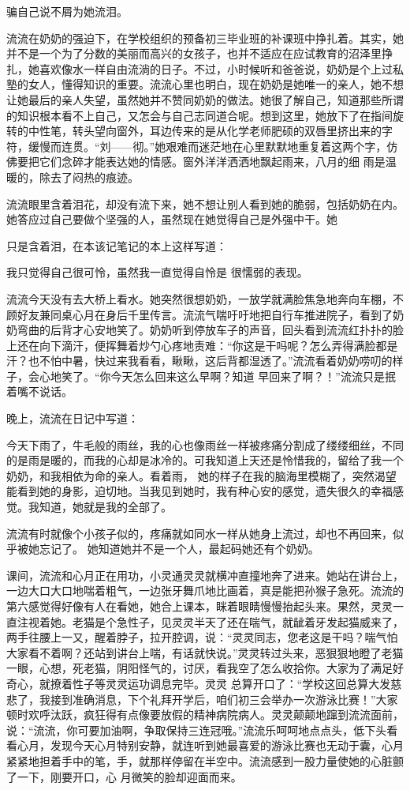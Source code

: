 \documentclass{article}
\begin{document}
\newpage
骗自己说不屑为她流泪。 

流流在奶奶的强迫下，在学校组织的预备初三毕业班的补课班中挣扎着。其实，她并不是一个为了分数的美丽而高兴的女孩子，也并不适应在应试教育的沼泽里挣扎，她喜欢像水一样自由流淌的日子。不过，小时候听和爸爸说，奶奶是个上过私塾的女人，懂得知识的重要。流流心里也明白，现在奶奶是她唯一的亲人，她不想让她最后的亲人失望，虽然她并不赞同奶奶的做法。她很了解自己，知道那些所谓的知识根本看不上自己，又怎会与自己志同道合呢。想到这里，她放下了在指间旋转的中性笔，转头望向窗外，耳边传来的是从化学老师肥硕的双唇里挤出来的字符，缓慢而连贯。“刘——彻。”她艰难而迷茫地在心里默默地重复着这两个字，仿佛要把它们念碎才能表达她的情感。窗外洋洋洒洒地飘起雨来，八月的细
雨是温暖的，除去了闷热的痕迹。 

流流眼里含着泪花，却没有流下来，她不想让别人看到她的脆弱，包括奶奶在内。她答应过自己要做个坚强的人，虽然现在她觉得自己是外强中干。她

\newpage
只是含着泪，在本该记笔记的本上这样写道： 

我只觉得自己很可怜，虽然我一直觉得自怜是
很懦弱的表现。 

流流今天没有去大桥上看水。她突然很想奶奶，一放学就满脸焦急地奔向车棚，不顾好友兼同桌心月在身后千里传言。流流气喘吁吁地把自行车推进院子，看到了奶奶弯曲的后背才心安地笑了。奶奶听到停放车子的声音，回头看到流流红扑扑的脸上还在向下滴汗，便挥舞着炒勺心疼地责难：“你这是干吗呢？怎么弄得满脸都是汗？也不怕中暑，快过来我看看，瞅瞅，这后背都湿透了。”流流看着奶奶唠叨的样子，会心地笑了。“你今天怎么回来这么早啊？知道
早回来了啊？！”流流只是抿着嘴不说话。 


晚上，流流在日记中写道： 

今天下雨了，牛毛般的雨丝，我的心也像雨丝一样被疼痛分割成了缕缕细丝，不同的是雨是暖的，而我的心却是冰冷的。可我知道上天还是怜惜我的，留给了我一个奶奶，和我相依为命的亲人。看着雨，
\newpage
她的样子在我的脑海里模糊了，突然渴望能看到她的身影，迫切地。当我见到她时，我有种心安的感觉，遗失很久的幸福感觉。我知道，她就是我的全部了。
 

流流有时就像个小孩子似的，疼痛就如同水一样从她身上流过，却也不再回来，似乎被她忘记了。
她知道她并不是一个人，最起码她还有个奶奶。 

课间，流流和心月正在用功，小灵通灵灵就横冲直撞地奔了进来。她站在讲台上，一边大口大口地喘着粗气，一边张牙舞爪地比画着，真是能把孙猴子急死。流流的第六感觉得好像有人在看她，她合上课本，眯着眼睛慢慢抬起头来。果然，灵灵一直注视着她。老猫是个急性子，见灵灵半天了还在喘气，就龇着牙发起猫威来了，两手往腰上一又，醒着脖子，拉开腔调，说：“灵灵同志，您老这是干吗？喘气怕大家看不着啊？还站到讲台上喘，有话就快说。”灵灵转过头来，恶狠狠地瞪了老猫一眼，心想，死老猫，阴阳怪气的，讨厌，看我空了怎么收拾你。大家为了满足好奇心，就撩着性子等灵灵运功调息完毕。灵灵
\newpage
总算开口了：“学校这回总算大发慈悲了，我接到准确消息，下个礼拜开学后，咱们初三会举办一次游泳比赛！”大家顿时欢呼汰跃，疯狂得有点像要放假的精神病院病人。灵灵颠颠地蹿到流流面前，说：“流流，你可要加油啊，争取保持三连冠哦。”流流乐呵呵地点点头，低下头看看心月，发现今天心月特别安静，就连听到她最喜爱的游泳比赛也无动于囊，心月紧紧地担着手中的笔，手，就那样停留在半空中。流流感到一股力量使她的心脏颤了一下，刚要开口，心
月微笑的脸却迎面而来。 
\end{document}
